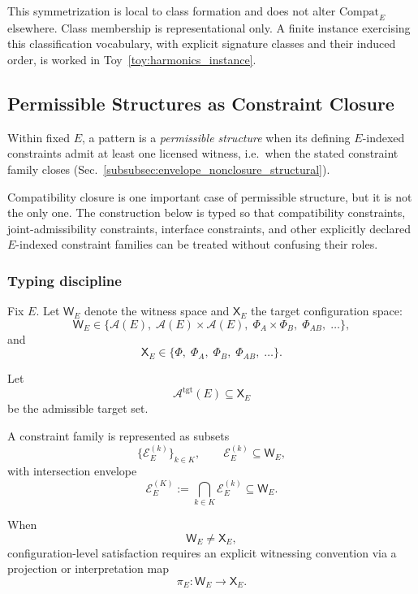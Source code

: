 \documentclass[aps,prx,onecolumn,11pt]{revtex4-2}
\theoremstyle{plain}
\theoremstyle{definition}
\theoremstyle{remark}
\begin{document}
This symmetrization is local to class formation and does not alter
\(\mathrm{Compat}_E\) elsewhere. Class membership is representational
only. A finite instance exercising this classification vocabulary,
with explicit signature classes and their induced order, is worked in
Toy~\ref{toy:harmonics_instance}.

\subsection{Permissible Structures as Constraint Closure}
\label{subsec:permissible_structure_struct}

Within fixed \(E\), a pattern is a \emph{permissible structure} when its
defining \(E\)-indexed constraints admit at least one licensed witness,
i.e.\ when the stated constraint family closes
(Sec.~\ref{subsubsec:envelope_nonclosure_structural}).

Compatibility closure is one important case of permissible structure,
but it is not the only one. The construction below is typed so that
compatibility constraints, joint-admissibility constraints, interface
constraints, and other explicitly declared \(E\)-indexed constraint
families can be treated without confusing their roles.

\subsubsection{Typing discipline}
\label{subsubsec:permissible_structure_typing}

Fix \(E\). Let \(\mathsf{W}_E\) denote the witness space and
\(\mathsf{X}_E\) the target configuration space:
\[
\mathsf{W}_E
\in
\{
\mathcal{A}(E),\;
\mathcal{A}(E)\times\mathcal{A}(E),\;
\Phi_A\times\Phi_B,\;
\Phi_{AB},\;
\ldots
\},
\]
and
\[
\mathsf{X}_E
\in
\{
\Phi,\;
\Phi_A,\;
\Phi_B,\;
\Phi_{AB},\;
\ldots
\}.
\]

Let
\[
\mathcal{A}^{\mathrm{tgt}}(E)
\subseteq
\mathsf{X}_E
\]
be the admissible target set.

A constraint family is represented as subsets
\[
\{\mathcal{E}^{(k)}_E\}_{k\in K},
\qquad
\mathcal{E}^{(k)}_E\subseteq\mathsf{W}_E,
\]
with intersection envelope
\begin{equation}
\mathcal{E}^{(K)}_E
:=
\bigcap_{k\in K}
\mathcal{E}^{(k)}_E
\subseteq
\mathsf{W}_E.
\label{eq:permissible_structure_intersection_envelope}
\end{equation}

When
\[
\mathsf{W}_E\neq\mathsf{X}_E,
\]
configuration-level satisfaction requires an explicit witnessing
convention via a projection or interpretation map
\[
\pi_E:\mathsf{W}_E\to\mathsf{X}_E.
\]
\end{document}
